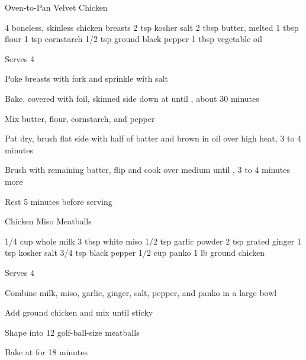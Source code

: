 \begin{denserecipe}{Oven-to-Pan Velvet Chicken}{}
\begin{ingredients}
4 boneless, skinless chicken breasts
2 tsp kosher salt
2 tbsp butter, melted
1 tbsp flour
1 tsp cornstarch
1/2 tsp ground black pepper
1 tbsp vegetable oil
\end{ingredients}
\nextcolumn
Serves 4
\begin{steps}
    \item Poke breasts with fork and sprinkle with salt
    \item Bake, covered with foil, skinned side down at  until , about 30 minutes
    \item Mix butter, flour, cornstarch, and pepper
    \item Pat dry, brush flat side with half of batter and brown in oil over high heat, 3 to 4 minutes
    \item Brush with remaining batter, flip and cook over medium until , 3 to 4 minutes more
    \item Rest 5 minutes before serving
\end{steps}
\end{denserecipe}

\begin{recipe}{Chicken Miso Meatballs}{}
\begin{ingredients}
1/4 cup whole milk
3 tbsp white miso
1/2 tsp garlic powder
2 tsp grated ginger
1 tsp kosher salt
3/4 tsp black pepper
1/2 cup panko
1 lb ground chicken
\end{ingredients}
\nextcolumn
Serves 4
\begin{steps}
    \item Combine milk, miso, garlic, ginger, salt, pepper, and panko in a large bowl
    \item Add ground chicken and mix until sticky
    \item Shape into 12 golf-ball-size meatballs
    \item Bake at  for 18 minutes
\end{steps}
\end{recipe}

